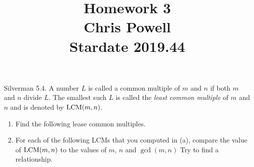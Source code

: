 \documentclass[10pt,twoside]{amsart}
\begin{document}
\title{Homework 3\\\textnormal{Chris Powell\\Stardate 2019.44} }
\maketitle
\thispagestyle{firststyle}

\begin{exercises}
\item Silverman 5.4. A number $L$ is called a common multiple of $m$ and $n$ if both $m$ and $n$ divide $L$. The smallest such $L$ is called the \textit{least common multiple} of $m$ and $n$ and is denoted by $\operatorname{LCM}(m,n)$.

        \begin{enumerate}[label=(\alph*)]
        \item Find the following lease common multiples.

            


        \item For each of the following LCMs that you computed in (a), compare the value of $\operatorname{LCM}(m,n)$ to the values of $m$, $n$ and $\gcd(m,n)$ Try to find a relationship.
        
\end{enumerate}
\end{exercises}
\end{document}
